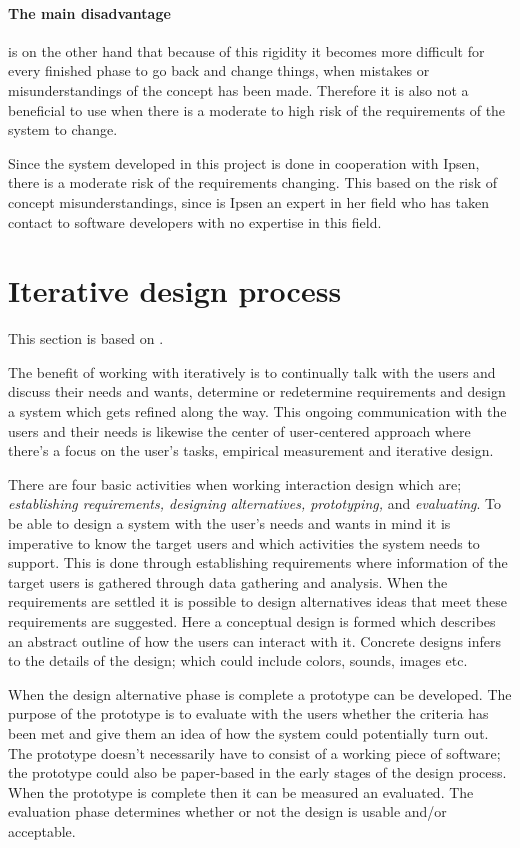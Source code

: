 \paragraph{The main disadvantage} is on the other hand that because of this rigidity it becomes more difficult for every finished phase to go back and change things, when mistakes or misunderstandings of the concept has been made.
Therefore it is also not a beneficial to use when there is a moderate to high risk of the requirements of the system to change.

Since the system developed in this project is done in cooperation with Ipsen, there is a moderate risk of the requirements changing.
This based on the risk of concept misunderstandings, since is Ipsen an expert in her field who has taken contact to software developers with no expertise in this field.

\section{Iterative design process} \label{sec:iterativ}
This section is based on \cite{InteractionDesign}.

The benefit of working with iteratively is to continually talk with the users and discuss their needs and wants, determine or redetermine requirements and design a system which gets refined along the way. This ongoing communication with the users and their needs is likewise the center of user-centered approach where there’s a focus on the user’s tasks, empirical measurement and iterative design.

There are four basic activities when working interaction design which are; \textit{establishing requirements, designing alternatives, prototyping,} and \textit{evaluating}. To be able to design a system with the user’s needs and wants in mind it is imperative to know the target users and which activities the system needs to support. This is done through establishing requirements where information of the target users is gathered through data gathering and analysis. When the requirements are settled it is possible to design alternatives ideas that meet these requirements are suggested. Here a conceptual design is formed which describes an abstract outline of how the users can interact with it. Concrete designs infers to the details of the design; which could include colors, sounds, images etc. 

When the design alternative phase is complete a prototype can be developed. The purpose of the prototype is to evaluate with the users whether the criteria has been met and give them an idea of how the system could potentially turn out. The prototype doesn’t necessarily have to consist of a working piece of software; the prototype could also be paper-based in the early stages of the design process. When the prototype is complete then it can be measured an evaluated. The evaluation phase determines whether or not the design is usable and/or acceptable. 

